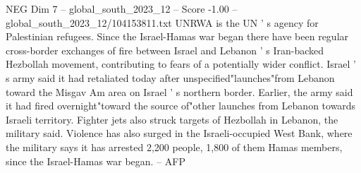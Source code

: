 \begin{textsample}{NEG Dim 7 – global\_south\_2023\_12 – Score -1.00 – global\_south\_2023\_12/104153811.txt}
UNRWA is the UN ' s agency for Palestinian refugees.
Since the Israel-Hamas war began there have been regular cross-border exchanges of fire between Israel and Lebanon ' s Iran-backed Hezbollah movement, contributing to fears of a potentially wider conflict.
Israel ' s army said it had retaliated today after unspecified"launches"from Lebanon toward the Misgav Am area on Israel ' s northern border.
Earlier, the army said it had fired overnight"toward the source of"other launches from Lebanon towards Israeli territory.
Fighter jets also struck targets of Hezbollah in Lebanon, the military said.
Violence has also surged in the Israeli-occupied West Bank, where the military says it has arrested 2,200 people, 1,800 of them Hamas members, since the Israel-Hamas war began. -- AFP

\end{textsample}
